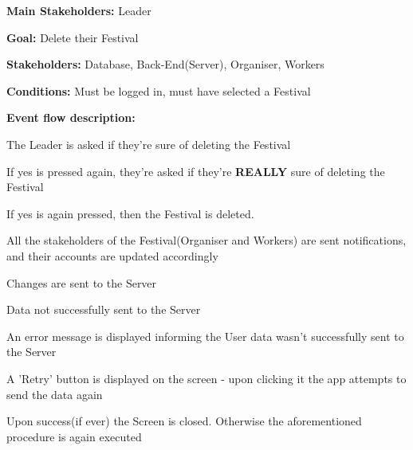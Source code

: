 				\noindent {}
				\begin{packed_item}
					\item \textbf{Main Stakeholders:} Leader
					\item \textbf{Goal:} Delete their Festival
					\item \textbf{Stakeholders: } Database, Back-End(Server), Organiser, Workers
					\item \textbf{Conditions: } Must be logged in, must have selected a Festival
					\item \textbf{Event flow description: }
					\begin{packed_enum}
						\item The Leader is asked if they're sure of deleting the Festival
						\item If yes is pressed again, they're asked if they're \textbf{REALLY} sure of deleting the Festival
						\item If yes is again pressed, then the Festival is deleted.
						\item All the stakeholders of the Festival(Organiser and Workers) are sent notifications, and their accounts are updated accordingly
						\item Changes are sent to the Server
					\end{packed_enum}
					
					\begin{packed_item}
						\item[4.a, 5.a] Data not successfully sent to the Server
						\item[] \begin{packed_enum}
							\item An error message is displayed informing the User data wasn't successfully sent to the Server
							\item A 'Retry' button is displayed on the screen - upon clicking it the app attempts to send the data again
							\item Upon success(if ever) the Screen is closed. Otherwise the aforementioned procedure is again executed
						\end{packed_enum}
					\end{packed_item}
			\end{packed_item}
			
